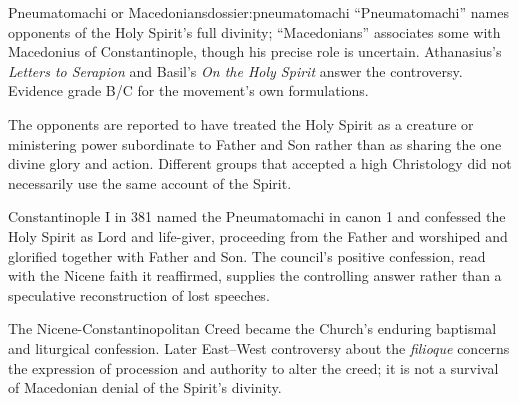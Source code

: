 \begin{heresydossier}{Pneumatomachi or Macedonians}{dossier:pneumatomachi}
\objectfield ``Pneumatomachi'' names opponents of the Holy Spirit's full divinity; ``Macedonians'' associates some with Macedonius of Constantinople, though his precise role is uncertain. Athanasius's \emph{Letters to Serapion} and Basil's \emph{On the Holy Spirit} answer the controversy. Evidence grade B/C for the movement's own formulations.

\propositionfield The opponents are reported to have treated the Holy Spirit as a creature or ministering power subordinate to Father and Son rather than as sharing the one divine glory and action. Different groups that accepted a high Christology did not necessarily use the same account of the Spirit.

\responsefield Constantinople I in 381 named the Pneumatomachi in canon 1 and confessed the Holy Spirit as Lord and life-giver, proceeding from the Father and worshiped and glorified together with Father and Son. The council's positive confession, read with the Nicene faith it reaffirmed, supplies the controlling answer rather than a speculative reconstruction of lost speeches.

\aftermathfield The Nicene-Constantinopolitan Creed became the Church's enduring baptismal and liturgical confession. Later East--West controversy about the \emph{filioque} concerns the expression of procession and authority to alter the creed; it is not a survival of Macedonian denial of the Spirit's divinity.
\end{heresydossier}


